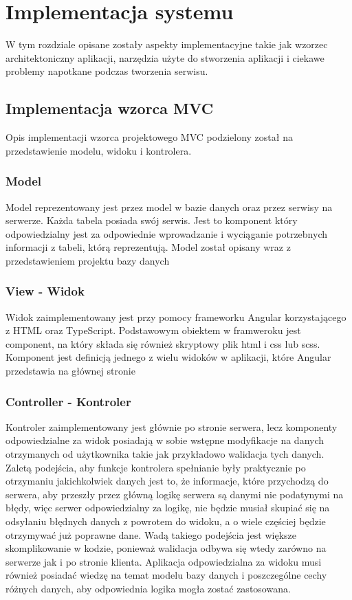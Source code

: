 \chapter{Implementacja systemu}
\thispagestyle{chapterBeginStyle}
W tym rozdziale opisane zostały aspekty implementacyjne takie jak wzorzec architektoniczny aplikacji, narzędzia użyte do stworzenia aplikacji  i ciekawe problemy napotkane podczas tworzenia serwisu.
\section{Implementacja  wzorca  MVC}
Opis implementacji wzorca projektowego MVC podzielony został na przedstawienie modelu, widoku i kontrolera.
\subsection{Model}
Model reprezentowany jest przez model w bazie danych oraz przez serwisy na serwerze. 
 Każda tabela posiada swój serwis. Jest to komponent który odpowiedzialny jest za odpowiednie wprowadzanie i wyciąganie potrzebnych informacji z tabeli, którą reprezentują. Model został opisany wraz z przedstawieniem projektu bazy danych 
\subsection{View - Widok}
Widok zaimplementowany jest przy pomocy frameworku Angular korzystającego z HTML oraz TypeScript. Podstawowym obiektem w framweroku jest component,  na który składa się również skryptowy plik html i css lub scss. Komponent jest definicją jednego z wielu widoków w aplikacji, które Angular przedstawia na głównej stronie 
\subsection{Controller - Kontroler}
Kontroler zaimplementowany jest głównie po stronie serwera, lecz komponenty odpowiedzialne za widok posiadają w sobie wstępne modyfikacje na danych otrzymanych od użytkownika takie jak przykładowo walidacja tych danych. Zaletą podejścia, aby funkcje kontrolera spełnianie były praktycznie po otrzymaniu jakichkolwiek danych jest to, że informacje, które przychodzą do serwera, aby przeszły przez główną logikę serwera są danymi nie podatynymi na błędy, więc serwer odpowiedzialny za logikę, nie będzie musiał skupiać się na odsyłaniu błędnych danych z powrotem do widoku, a o wiele częściej będzie otrzymywać już poprawne dane. Wadą takiego podejścia jest większe skomplikowanie w kodzie, ponieważ walidacja odbywa się wtedy zarówno na serwerze jak i po stronie klienta. Aplikacja odpowiedzialna za widoku musi również posiadać wiedzę na temat modelu bazy danych i poszczególne cechy różnych danych, aby odpowiednia logika mogła zostać zastosowana.

